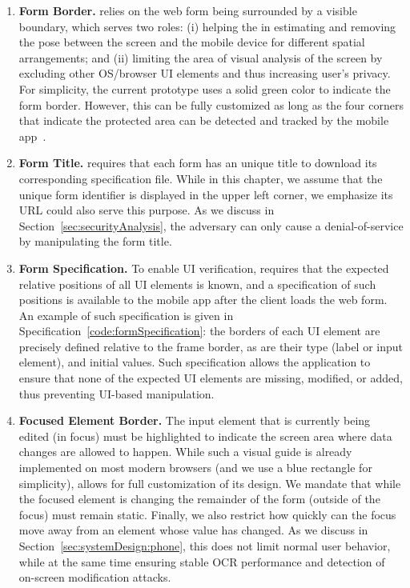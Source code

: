 \begin{enumerate}
	\item[\one] \textbf{Form Border.}
	\sysname relies on the web form being surrounded by a visible boundary, which serves two roles:
	(i) helping the \app in estimating and removing the pose between the screen and the mobile device for different spatial arrangements; and
	(ii) limiting the area of visual analysis of the screen by excluding other OS/browser UI elements and thus increasing user's privacy.
	For simplicity, the current prototype uses a solid green color to indicate the form border.
	However, this can be fully customized as long as the four corners that indicate the protected area can be detected and tracked by the mobile app~\cite{zhang2002visual}.


	\item[\two] \textbf{Form Title.} \sysname requires that each form has an unique title to download its corresponding specification file.
	While in this chapter, we assume that the unique form identifier is displayed in the upper left corner, we emphasize its URL could also serve this purpose.
	As we discuss in Section~\ref{sec:securityAnalysis}, the adversary can only cause a denial-of-service by manipulating the form title.

	\item[\three] \textbf{Form Specification.}
	To enable UI verification, \sysname requires that the expected relative positions of all UI elements is known, and a specification of such positions is available to the mobile app after the client loads the web form.
	An example of such specification is given in Specification~\ref{code:formSpecification}: the borders of each UI element are precisely defined relative to the frame border, as are their type (label or input element), and initial values.
	Such specification allows the application to ensure that none of the expected UI elements are missing, modified, or added, thus preventing UI-based manipulation.

	\item[\four] \textbf{Focused Element Border.}
	The input element that is currently being edited (in focus) must be highlighted to indicate the screen area where data changes are allowed to happen.
	While such a visual guide is already implemented on most modern browsers (and we use a blue rectangle for simplicity), \sysname allows for full customization of its design.
	We mandate that while the focused element is changing the remainder of the form (outside of the focus) must remain static.
	Finally, we also restrict how quickly can the focus move away from an element whose value has changed.
	As we discuss in Section~\ref{sec:systemDesign:phone}, this does not limit normal user behavior, while at the same time ensuring stable OCR performance and detection of on-screen modification attacks.


\end{enumerate}
